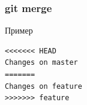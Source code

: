 \documentclass[pdf,russian,aspectratio=169]{beamer}
\begin{document}
\begin{frame}[fragile]
    \frametitle{git merge}
    \pause
    \begin{exampleblock}{Пример}
        \begin{Verbatim}
<<<<<<< HEAD
Changes on master
=======
Changes on feature
>>>>>>> feature
        \end{Verbatim}
    \end{exampleblock}
\end{frame}
\end{document}
